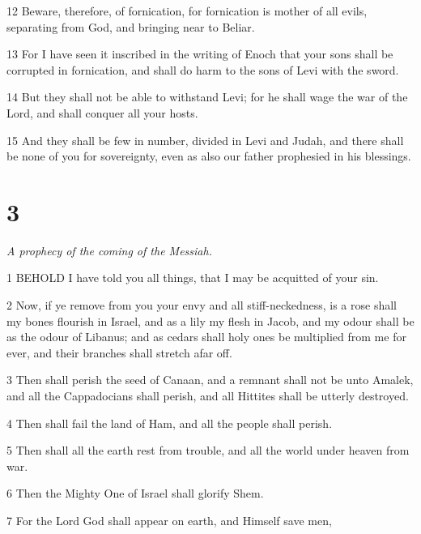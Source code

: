 \par 12 Beware, therefore, of fornication, for fornication is mother of all evils, separating from God, and bringing near to Beliar.

\par 13 For I have seen it inscribed in the writing of Enoch that your sons shall be corrupted in fornication, and shall do harm to the sons of Levi with the sword.

\par 14 But they shall not be able to withstand Levi; for he shall wage the war of the Lord, and shall conquer all your hosts.

\par 15 And they shall be few in number, divided in Levi and Judah, and there shall be none of you for sovereignty, even as also our father prophesied in his blessings.

\chapter{3}

\par \textit{A prophecy of the coming of the Messiah.}

\par 1 BEHOLD I have told you all things, that I may be acquitted of your sin.

\par 2 Now, if ye remove from you your envy and all stiff-neckedness, is a rose shall my bones flourish in Israel, and as a lily my flesh in Jacob, and my odour shall be as the odour of Libanus; and as cedars shall holy ones be multiplied from me for ever, and their branches shall stretch afar off.

\par 3 Then shall perish the seed of Canaan, and a remnant shall not be unto Amalek, and all the Cappadocians shall perish, and all Hittites shall be utterly destroyed.

\par 4 Then shall fail the land of Ham, and all the people shall perish.

\par 5 Then shall all the earth rest from trouble, and all the world under heaven from war.

\par 6 Then the Mighty One of Israel shall glorify Shem.

\par 7 For the Lord God shall appear on earth, and Himself save men,

